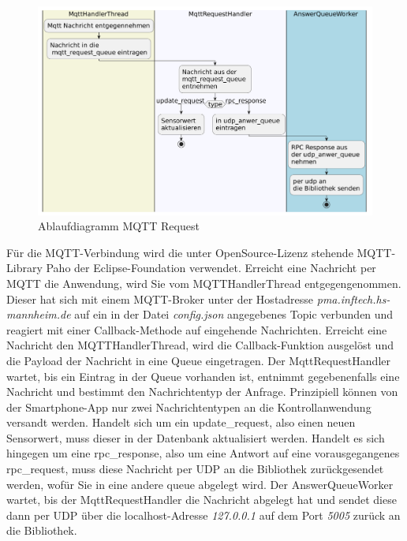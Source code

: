 \documentclass[11pt,a4paper]{report}
\begin{document}
\begin{figure}[htbp]
  \centering
  \includegraphics[width=\textwidth]{images/MqttRequestServerPath}
  \caption{Ablaufdiagramm MQTT Request}
  \label{fig:serverMqttReqPath}
\end{figure}
Für die MQTT-Verbindung wird die unter OpenSource-Lizenz stehende MQTT-Library Paho \cite{paho} der Eclipse-Foundation verwendet. 
Erreicht eine Nachricht per MQTT die Anwendung, wird Sie vom MQTTHandlerThread entgegengenommen.
Dieser hat sich mit einem MQTT-Broker unter der Hostadresse \textit{pma.inftech.hs-mannheim.de} auf ein in der Datei \textit{config.json} angegebenes Topic verbunden und reagiert mit einer Callback-Methode auf eingehende Nachrichten.
Erreicht eine Nachricht den MQTTHandlerThread, wird die Callback-Funktion ausgelöst und die Payload der Nachricht in eine Queue eingetragen.
Der MqttRequestHandler wartet, bis ein Eintrag in der Queue vorhanden ist, entnimmt gegebenenfalls eine Nachricht und bestimmt den Nachrichtentyp der Anfrage.
Prinzipiell können von der Smartphone-App nur zwei Nachrichtentypen an die Kontrollanwendung versandt werden.
Handelt sich um ein update\_request, also einen neuen Sensorwert, muss dieser in der Datenbank aktualisiert werden.
Handelt es sich hingegen um eine rpc\_response, also um eine Antwort auf eine vorausgegangenes rpc\_request, muss diese Nachricht per UDP an die Bibliothek zurückgesendet werden, wofür Sie in eine andere queue abgelegt wird.
Der AnswerQueueWorker wartet, bis der MqttRequestHandler die Nachricht abgelegt hat und sendet diese dann per UDP über die localhost-Adresse \textit{127.0.0.1} auf dem Port \textit{5005} zurück an die Bibliothek.
\end{document}
